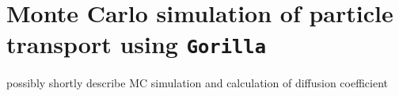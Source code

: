 \documentclass[./main.tex]{subfiles}
\begin{document}
\chapter{Monte Carlo simulation of particle transport using \texttt{Gorilla}}
possibly shortly describe MC simulation and calculation of diffusion coefficient
%
\newpage
\end{document}
